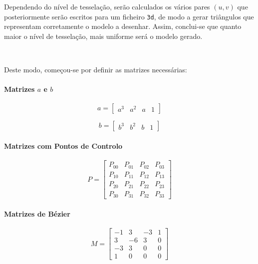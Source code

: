 \documentclass[a4paper, 11pt]{article}
\begin{document}
Dependendo do nível de tesselação, serão calculados os vários pares $(u, v)$ que 
posteriormente serão escritos para um ficheiro \texttt{3d}, de modo a gerar triângulos que 
representam corretamente o modelo a desenhar. Assim, conclui-se que quanto maior o nível de 
tesselação, mais uniforme será o modelo gerado.

\

Deste modo, começou-se por definir as matrizes
necessárias:

\paragraph{Matrizes $a$ e $b$}

\begin{equation*}
    a = \begin{bmatrix}
        a^3 & a^2 & a & 1
        \end{bmatrix}
\end{equation*}

\begin{equation*}
    b = \begin{bmatrix}
        b^3 & b^2 & b & 1
        \end{bmatrix}
\end{equation*}

\paragraph{Matrizes com Pontos de Controlo}

\begin{equation*}
    P = \begin{bmatrix}
        P_{00} & P_{01} & P_{02} & P_{03} \\
        P_{10} & P_{11} & P_{12} & P_{13} \\
        P_{20} & P_{21} & P_{22} & P_{23} \\
        P_{30} & P_{31} & P_{32} & P_{33} 
        \end{bmatrix}
\end{equation*}

\paragraph{Matrizes de Bézier}

\begin{equation*}
    M = \begin{bmatrix}
        -1 & 3 & -3 & 1 \\
        3 & -6 & 3 & 0 \\
        -3 & 3 & 0 & 0 \\
        1 & 0 & 0 & 0
        \end{bmatrix}
\end{equation*}
\end{document}
